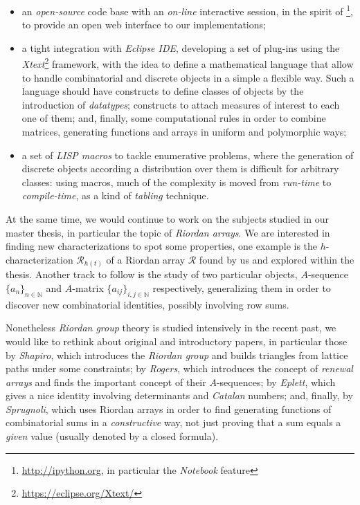 \begin{itemize} 

    \item an \emph{open-source} code base with an \emph{on-line} interactive
    session, in the spirit of \footnote{\url{http://ipython.org}, in particular
    the \emph{Notebook} feature}, to provide an open web interface to our
    implementations; 

    \item a tight integration with \emph{Eclipse IDE}, developing a set of
    plug-ins using the \emph{Xtext}\footnote{\url{https://eclipse.org/Xtext/}}
    framework, with the idea to define a mathematical language that allow to
    handle combinatorial and discrete objects in a simple a flexible way. Such
    a language should have constructs to define classes of objects by the
    introduction of \emph{datatypes}; constructs to attach measures of interest
    to each one of them; and, finally, some computational rules in order to
    combine matrices, generating functions and arrays in uniform and
    polymorphic ways; 

    \item a set of \emph{LISP macros} to tackle enumerative problems, where the
    generation of discrete objects according a distribution over them is
    difficult for arbitrary classes: using macros, much of the complexity is
    moved from \emph{run-time} to \emph{compile-time}, as a kind of
    \emph{tabling} technique.

\end{itemize}

At the same time, we would continue to work on the subjects studied in our
master thesis, in particular the topic of \emph{Riordan arrays}. We are
interested in finding new characterizations to spot some properties, one
example is the $h$-characterization $\mathcal{R}_{h(t)}$ of a Riordan array
$\mathcal{R}$ found by us and explored within the thesis.  Another track to
follow is the study of two particular objects, $A$-sequence $\lbrace
a_{n}\rbrace_{n\in\mathbb{N}}$ and $A$-matrix $\lbrace
a_{ij}\rbrace_{i,j\in\mathbb{N}}$ respectively, generalizing them in order to
discover new combinatorial identities, possibly involving row sums.

Nonetheless \emph{Riordan group} theory is studied intensively in the recent past, we would like
to rethink about original and introductory papers, in particular those by
\emph{Shapiro}, which introduces the \emph{Riordan group} and builds triangles
from lattice paths under some constraints; by \emph{Rogers}, which introduces
the concept of \emph{renewal arrays} and finds the important concept of their
$A$-sequences; by \emph{Eplett}, which gives a nice identity involving
determinants and \emph{Catalan} numbers; and, finally, by \emph{Sprugnoli},
which uses Riordan arrays in order to find generating functions of
combinatorial sums in a \emph{constructive} way, not just proving that a sum
equals a \emph{given} value (usually denoted by a closed formula). 

